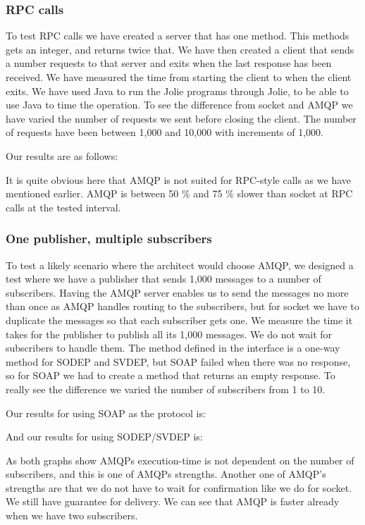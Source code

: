 \subsubsection{RPC calls}
To test RPC calls we have created a server that has one method. This methods gets an integer, and returns twice that. We have then created a client that sends a number requests to that server and exits when the last response has been received. We have measured the time from starting the client to when the client exits. We have used Java to run the Jolie programs through Jolie, to be able to use Java to time the operation. To see the difference from socket and AMQP we have varied the number of requests we sent before closing the client. The number of requests have been between 1,000 and 10,000 with increments of 1,000.

Our results are as follows:


It is quite obvious here that AMQP is not suited for RPC-style calls as we have mentioned earlier. AMQP is between 50 \% and 75 \% slower than socket at RPC calls at the tested interval.

\subsubsection{One publisher, multiple subscribers}
To test a likely scenario where the architect would choose AMQP, we designed a test where we have a publisher that sends 1,000 messages to a number of subscribers. Having the AMQP server enables us to send the messages no more than once as AMQP handles routing to the subscribers, but for socket we have to duplicate the messages so that each subscriber gets one. We measure the time it takes for the publisher to publish all its 1,000 messages. We do not wait for subscribers to handle them. The method defined in the interface is a one-way method for SODEP and SVDEP, but SOAP failed when there was no response, so for SOAP we had to create a method that returns an empty response. To really see the difference we varied the number of subscribers from 1 to 10.

Our results for using SOAP as the protocol is:



And our results for using SODEP/SVDEP is:



As both graphs show AMQPs execution-time is not dependent on the number of subscribers, and this is one of AMQPs strengths. Another one of AMQP's strengths are that we do not have to wait for confirmation like we do for socket. We still have guarantee for delivery. We can see that AMQP is faster already when we have two subscribers.
